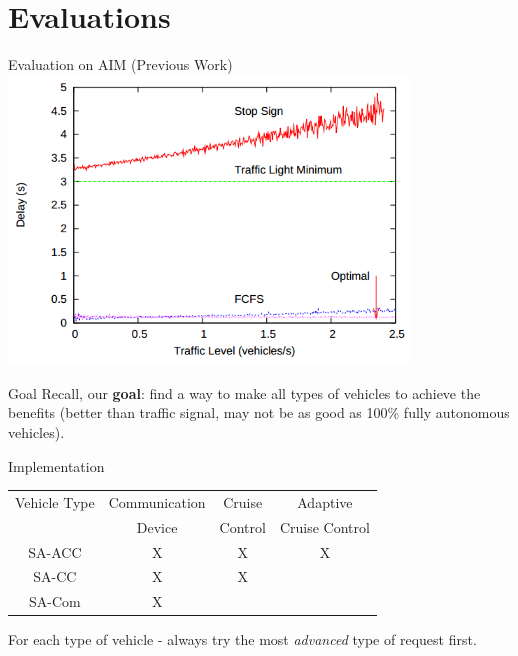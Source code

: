 \documentclass{beamer}
\newcommand{\goal}{find a way to make all types of vehicles to
achieve the benefits (better than traffic signal, may not be as good
as 100\% fully autonomous vehicles)}
\begin{document}
\section{Evaluations}

\begin{frame}{Evaluation on AIM (Previous Work)}
\includegraphics[width=0.8\textwidth]{old_result.png}

\cite{bib:Dresner08Multiagent}
\end{frame}

\begin{frame}{Goal}
Recall, our \textbf{goal}: \pause \goal.
\end{frame}

\begin{frame}{Implementation}
\begin{tabular}{|c|c|c|c|}
  \hline
  Vehicle Type & Communication & Cruise & Adaptive \\
               & Device & Control & Cruise Control \\
  \hline
  SA-ACC & X & X & X  \\
  \hline
  SA-CC & X & X &  \\
  \hline
  SA-Com & X & &  \\
  \hline
\end{tabular}

\hfill

For each type of vehicle - always try the most \emph{advanced} type of
request first.
\end{frame}
\end{document}

